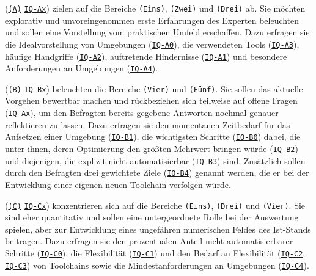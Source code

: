 \textbf{} (\texttt{\hyperref[subsubsec:04-01-02-02_form]{(A)}} \textrightarrow \texttt{\hyperref[subsec:AA-01-01_open-questions]{IQ-Ax}}) zielen auf die Bereiche \texttt{(Eins)}, \texttt{(Zwei)} und \texttt{(Drei)} ab. Sie möchten explorativ und unvoreingenommen erste Erfahrungen des Experten beleuchten und sollen eine Vorstellung vom praktischen Umfeld erschaffen. Dazu erfragen sie die Idealvorstellung von Umgebungen (\texttt{\hyperref[subsec:AA-01-01_open-questions]{IQ-A0}}), die verwendeten Tools (\texttt{\hyperref[subsec:AA-01-01_open-questions]{IQ-A3}}), häufige Handgriffe (\texttt{\hyperref[subsec:AA-01-01_open-questions]{IQ-A2}}), auftretende Hindernisse (\texttt{\hyperref[subsec:AA-01-01_open-questions]{IQ-A1}}) und besondere Anforderungen an Umgebungen (\texttt{\hyperref[subsec:AA-01-01_open-questions]{IQ-A4}}).

\textbf{} (\texttt{\hyperref[subsubsec:04-01-02-02_form]{(B)}} \textrightarrow \texttt{\hyperref[subsec:AA-01-02_half-open-questions]{IQ-Bx}}) beleuchten die Bereiche \texttt{(Vier)} und \texttt{(Fünf)}. Sie sollen das aktuelle Vorgehen bewertbar machen und rückbeziehen sich teilweise auf offene Fragen (\texttt{\hyperref[subsec:AA-01-01_open-questions]{IQ-Ax}}), um den Befragten bereits gegebene Antworten nochmal genauer reflektieren zu lassen. Dazu erfragen sie den momentanen Zeitbedarf für das Aufsetzen einer Umgebung (\texttt{\hyperref[subsec:AA-01-02_half-open-questions]{IQ-B1}}), die wichtigsten Schritte (\texttt{\hyperref[subsec:AA-01-02_half-open-questions]{IQ-B0}}) dabei, die unter ihnen, deren Optimierung den größten Mehrwert bringen würde (\texttt{\hyperref[subsec:AA-01-02_half-open-questions]{IQ-B2}}) und diejenigen, die explizit nicht automatisierbar (\texttt{\hyperref[subsec:AA-01-02_half-open-questions]{IQ-B3}}) sind. Zusätzlich sollen durch den Befragten drei gewichtete Ziele (\texttt{\hyperref[subsec:AA-01-02_half-open-questions]{IQ-B4}}) genannt werden, die er bei der Entwicklung einer eigenen neuen Toolchain verfolgen würde.

\textbf{} (\texttt{\hyperref[subsubsec:04-01-02-02_form]{(C)}} \textrightarrow \texttt{\hyperref[subsec:AA-01-03_closed-questions]{IQ-Cx}}) konzentrieren sich auf die Bereiche \texttt{(Eins)}, \texttt{(Drei)} und \texttt{(Vier)}. Sie sind eher quantitativ und sollen eine untergeordnete Rolle bei der Auswertung spielen, aber zur Entwicklung eines ungefähren numerischen Feldes des Ist-Stands beitragen. Dazu erfragen sie den prozentualen Anteil nicht automatisierbarer Schritte (\texttt{\hyperref[subsec:AA-01-03_closed-questions]{IQ-C0}}), die Flexibilität (\texttt{\hyperref[subsec:AA-01-03_closed-questions]{IQ-C1}}) und den Bedarf an Flexibilität (\texttt{\hyperref[subsec:AA-01-03_closed-questions]{IQ-C2}}, \texttt{\hyperref[subsec:AA-01-03_closed-questions]{IQ-C3}}) von Toolchains sowie die Mindestanforderungen an Umgebungen (\texttt{\hyperref[subsec:AA-01-03_closed-questions]{IQ-C4}}).

